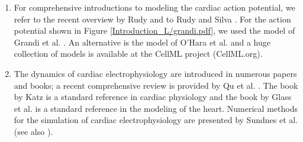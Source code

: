 \begin{enumerate}
\item For comprehensive introductions to modeling the cardiac action potential, we refer to the recent overview by Rudy \cite{Rudy2012} and to Rudy and Silva \cite{Rudy2006}.  For the action potential shown in Figure \ref{Introduction_L/grandi.pdf}, we used the model of Grandi et al. \cite{Grandi2010B}. An alternative is the model of O'Hara et al. \cite{Ohara2011} and a huge collection of models is available at the CellML project (CellML.org).
\item The dynamics of cardiac electrophysiology are introduced in numerous papers and books; a recent comprehensive review is provided by Qu et al. \cite{Qu2014}.  The book by Katz \cite{Katz2010} 
is a standard reference in cardiac physiology and the book by Glass et al. \cite{Glass2012} is a standard reference in the modeling of the heart. Numerical methods for the simulation of cardiac electrophysiology are presented by Sundnes et al. \cite{Sundnes2007} (see also \cite{Pullan2005, Franzone2014}). 

 

\end{enumerate}









